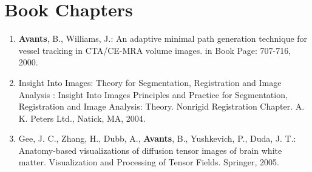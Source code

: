 \documentclass[11pt]{moderncv} %
\begin{document}
\section{Book Chapters}
\begin{enumerate}
\item \textbf{Avants}, B., Williams, J.: An adaptive minimal path generation technique for vessel tracking in CTA/CE-MRA volume images. in Book Page: 707-716, 2000.
\item Insight Into Images: Theory for Segmentation, Registration and Image Analysis :
Insight Into Images Principles and Practice for Segmentation, Registration and Image Analysis: Theory. Nonrigid Registration Chapter. A. K. Peters Ltd., Natick, MA, 2004.
\item Gee, J. C., Zhang, H., Dubb, A., \textbf{Avants}, B., Yushkevich, P., Duda, J. T.: Anatomy-based visualizations of diffusion tensor images of brain white matter. Visualization and Processing of Tensor Fields. Springer, 2005.
\end{enumerate}


% 
% 
\end{document}
